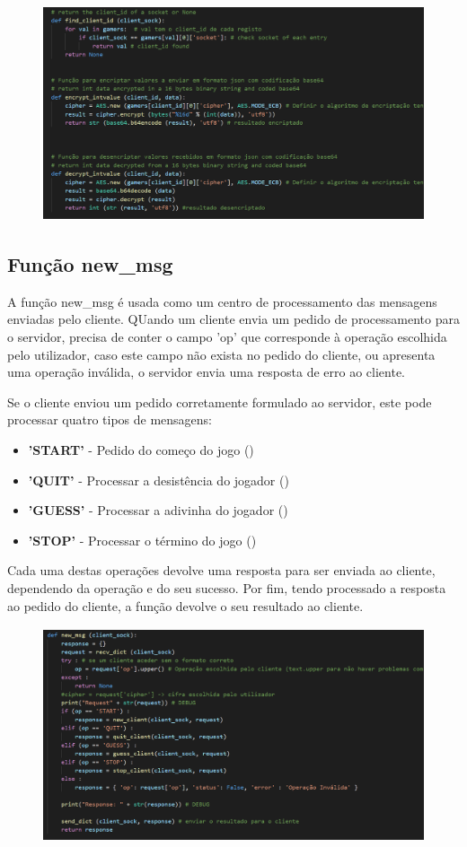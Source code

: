 \documentclass{report}
\begin{document}
\begin{figure}[!h]
\center
\includegraphics[height = 180pt]{img/cryptofindid.png}
\end{figure}

\subsection{Função new\_msg}
\label{ssec:func_new_msg}

A função new\_msg é usada como um centro de processamento das mensagens enviadas pelo cliente. QUando um cliente envia um pedido de processamento para o servidor, precisa de conter o campo 'op' que corresponde à operação escolhida pelo utilizador, caso este campo não exista no pedido do cliente, ou apresenta uma operação inválida, o servidor envia uma resposta de erro ao cliente.

Se o cliente enviou um pedido corretamente formulado ao servidor, este pode processar quatro tipos de mensagens:
\begin{itemize}
\item \textbf{'START'} - Pedido do começo do jogo ()
\item \textbf{'QUIT'} - Processar a desistência do jogador ()
\item \textbf{'GUESS'} - Processar a adivinha do jogador ()
\item \textbf{'STOP'} - Processar o término do jogo ()
\end{itemize}
Cada uma destas operações devolve uma resposta para ser enviada ao cliente, dependendo da operação e do seu sucesso. Por fim, tendo processado a resposta ao pedido do cliente, a função devolve o seu resultado ao cliente. 

\begin{figure}[!h]
\center
\includegraphics[height = 180pt]{img/newmsg.png}
\end{figure}
\end{document}
